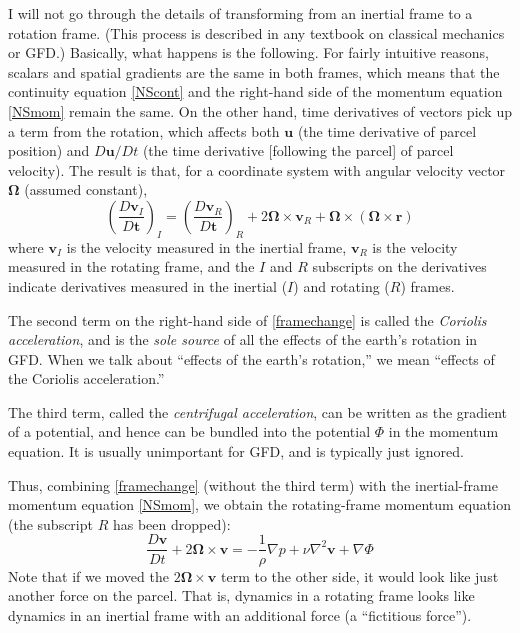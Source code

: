 \documentclass[11pt]{book}
\begin{document}
I will not go through the details of transforming from an inertial frame to a rotation frame.  (This process is described in any textbook on classical mechanics or GFD.)  Basically, what happens is the following.  For fairly intuitive reasons, scalars and spatial gradients are the same in both frames, which means that the continuity equation \eqref{NScont} and the right-hand side of the momentum equation \eqref{NSmom} remain the same.  On the other hand, time derivatives of vectors pick up a term from the rotation, which affects both $\mathbf{u}$ (the time derivative of parcel position) and $D\mathbf{u} / Dt$ (the time derivative [following the parcel] of parcel velocity).  The result is that, for a coordinate system with angular velocity vector $\mathbf{\Omega}$ (assumed constant),
\begin{equation}\left(\frac{D\mathbf{v}_I}{D\mathbf{t}}\right)_I = \left(\frac{D\mathbf{v}_R}{D\mathbf{t}}\right)_R + 2\mathbf{\Omega} \times \mathbf{v}_R + \mathbf{\Omega} \times (\mathbf{\Omega} \times \mathbf{r}) \label{framechange}\end{equation}
where $\mathbf{v}_I$ is the velocity measured in the inertial frame, $\mathbf{v}_R$ is the velocity measured in the rotating frame, and the $I$ and $R$ subscripts on the derivatives indicate derivatives measured in the inertial ($I$) and rotating ($R$) frames.

The second term on the right-hand side of \eqref{framechange} is called the \emph{Coriolis acceleration}, and is the \emph{sole source} of all the effects of the earth's rotation in GFD.  When we talk about ``effects of the earth's rotation,'' we mean ``effects of the Coriolis acceleration.''

The third term, called the \emph{centrifugal acceleration}, can be written as the gradient of a potential, and hence can be bundled into the potential $\Phi$ in the momentum equation.  It is usually unimportant for GFD, and is typically just ignored.

Thus, combining \eqref{framechange} (without the third term) with the inertial-frame momentum equation \eqref{NSmom}, we obtain the rotating-frame momentum equation (the subscript $R$ has been dropped):
\begin{equation}\frac{D\mathbf{v}}{Dt} + 2\mathbf{\Omega}\times \mathbf{v} = -\frac{1}{\rho}\nabla{p} + \nu\nabla^2 \mathbf{v} + \nabla \Phi \label{rotmom}\end{equation}
Note that if we moved the $2\mathbf{\Omega} \times \mathbf{v}$ term to the other side, it would look like just another force on the parcel.  That is, dynamics in a rotating frame looks like dynamics in an inertial frame with an additional force (a ``fictitious force'').
\end{document}
